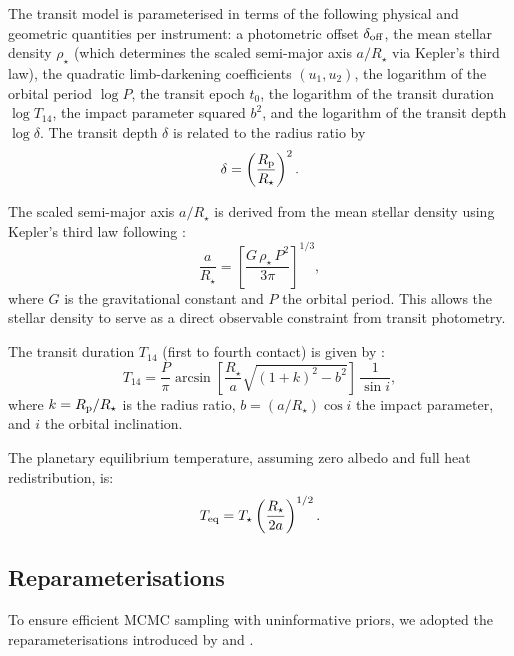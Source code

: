 \documentclass[fleqn,usenatbib]{mnras}
\newcommand{\rhostar}{\rho_{\star}}
\newcommand{\aors}{a/R_{\star}}
\begin{document}
The transit model is parameterised in terms of the following physical and geometric quantities per instrument: a photometric offset $\delta_{\rm off}$, the mean stellar density $\rhostar$ (which determines the scaled semi-major axis $\aors$ via Kepler's third law), the quadratic limb-darkening coefficients $(u_1, u_2)$, the logarithm of the orbital period $\log P$, the transit epoch $t_0$, the logarithm of the transit duration $\log T_{14}$, the impact parameter squared $b^2$, and the logarithm of the transit depth $\log \delta$. The transit depth $\delta$ is related to the radius ratio by
\begin{equation}
  \label{eq:depth}
  \delta = \left(\frac{R_{\rm p}}{R_{\star}}\right)^2.
\end{equation}

The scaled semi-major axis $\aors$ is derived from the mean stellar density using Kepler's third law following \citet{sozzetti2007}:
\begin{equation}
  \label{eq:aors}
  \frac{a}{R_{\star}} = \left[\frac{G\,\rhostar\,P^2}{3\pi}\right]^{1/3},
\end{equation}
where $G$ is the gravitational constant and $P$ the orbital period. This allows the stellar density to serve as a direct observable constraint from transit photometry.

The transit duration $T_{14}$ (first to fourth contact) is given by \citep{seagermallen2003, winn2014}:
\begin{equation}
  \label{eq:t14}
  T_{14} = \frac{P}{\pi}\arcsin\left[\frac{R_{\star}}{a}\sqrt{(1 + k)^2 - b^2}\right]\,\frac{1}{\sin i},
\end{equation}
where $k = R_{\rm p}/R_{\star}$ is the radius ratio, $b = (a/R_{\star})\cos i$ the impact parameter, and $i$ the orbital inclination.

The planetary equilibrium temperature, assuming zero albedo and full heat redistribution, is:
\begin{equation}
  \label{eq:teq}
  T_{\rm eq} = T_{\star}\left(\frac{R_{\star}}{2a}\right)^{1/2}.
\end{equation}

\subsection{Reparameterisations}
\label{sec:reparam}

To ensure efficient MCMC sampling with uninformative priors, we adopted the reparameterisations introduced by \citet{espinoza2018} and \citet{kipping2013}.
\end{document}
